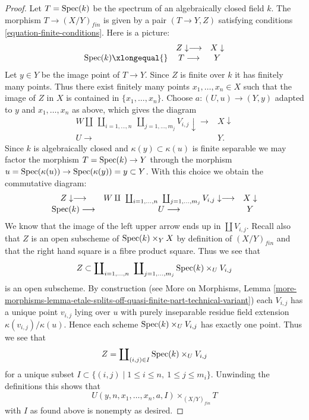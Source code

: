 \begin{proof}
\medskip\noindent
Let $T = \operatorname{Spec}(k)$ be the spectrum of an algebraically closed
field $k$. The morphism $T \to (X/Y)_{fin}$ is given by a pair
$(T \to Y, Z)$ satisfying conditions \ref{equation-finite-conditions}.
Here is a picture:
$$
\begin{array}{ccc} & Z \downarrow\longrightarrow & X \downarrow \\ \Spec(k) \xlongequal{} & T \longrightarrow & Y\end{array}
$$
Let $y \in Y$ be the image point of $T \to Y$.
Since $Z$ is finite over $k$ it has finitely many points.
Thus there exist finitely many points $x_1, \ldots, x_n \in X$
such that the image of $Z$ in $X$ is contained in $\{x_1, \ldots, x_n\}$.
Choose $a : (U, u) \to (Y, y)$ adapted to $y$ and $x_1, \ldots, x_n$ as
above, which gives the diagram
$$
\begin{array}{cc}W \amalg
\ \coprod\nolimits_{i = 1, \ldots, n}
\ \coprod\nolimits_{j = 1, \ldots, m_j}
V_{i, j} \downarrow\longrightarrow & X \downarrow \\ U \longrightarrow & Y.\end{array}
$$
Since $k$ is algebraically closed and
$\kappa(y) \subset \kappa(u)$ is finite separable
we may factor the morphism
$T = \operatorname{Spec}(k) \to Y$ through the morphism
$u = \operatorname{Spec}(\kappa(u)) \to \operatorname{Spec}(\kappa(y)) = y \subset Y$.
With this choice we obtain the commutative diagram:
$$
\begin{array}{ccc}Z \downarrow\longrightarrow & W \amalg
\ \coprod\nolimits_{i = 1, \ldots, n}
\ \coprod\nolimits_{j = 1, \ldots, m_j}
V_{i, j} \downarrow\longrightarrow & X \downarrow \\ \operatorname{Spec}(k) \longrightarrow & U \longrightarrow & Y\end{array}
$$
We know that the image of the left upper arrow ends up in
$\coprod V_{i, j}$. Recall also that $Z$ is an open subscheme
of $\operatorname{Spec}(k) \times_Y X$ by definition of $(X/Y)_{fin}$
and that the right hand square is a fibre product square.
Thus we see that
$$
Z \subset
\coprod\nolimits_{i = 1, \ldots, n}\ \coprod\nolimits_{j = 1, \ldots, m_j}
\operatorname{Spec}(k) \times_U V_{i, j}
$$
is an open subscheme. By construction (see
More on Morphisms, Lemma
\ref{more-morphisms-lemma-etale-splits-off-quasi-finite-part-technical-variant})
each $V_{i, j}$ has a unique point $v_{i, j}$ lying over $u$
with purely inseparable residue field extension
$\kappa(v_{i, j})/\kappa(u)$. Hence each
scheme $\operatorname{Spec}(k) \times_U V_{i, j}$ has exactly one
point. Thus we see that
$$
Z = \coprod\nolimits_{(i, j) \in I} \operatorname{Spec}(k) \times_U V_{i, j}
$$
for a unique subset
$I \subset \{(i, j) \mid 1 \leq i \leq n, \ 1 \leq j \leq m_i\}$.
Unwinding the definitions this shows that
$$
U(y, n, x_1, \ldots, x_n, a, I) \times_{(X/Y)_{fin}} T
$$
with $I$ as found above is nonempty as desired.
\end{proof}

